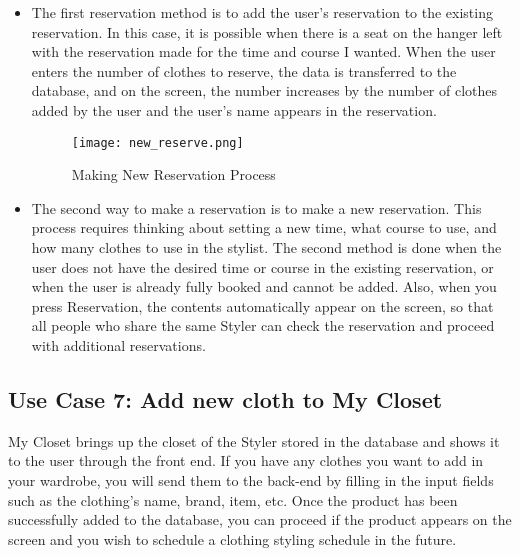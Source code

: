 \documentclass[conference]{IEEEtran}
\begin{document}
\newpage
\begin{itemize}
    \begin{figure}[htbp]
    \centerline{\texttt{[image: add\_reserve.png]}}
    \label{fig}
    \caption{Adding Reservation Process}
    \end{figure}
    \item The first reservation method is to add the user's reservation to the existing reservation. In this case, it is possible when there is a seat on the hanger left with the reservation made for the time and course I wanted. When the user enters the number of clothes to reserve, the data is transferred to the database, and on the screen, the number increases by the number of clothes added by the user and the user's name appears in the reservation.\\
    
    \begin{figure}[htbp]
    \centerline{\texttt{[image: new\_reserve.png]}}
    \label{fig}
    \caption{Making New Reservation Process}
    \end{figure}
    \item The second way to make a reservation is to make a new reservation. This process requires thinking about setting a new time, what course to use, and how many clothes to use in the stylist. The second method is done when the user does not have the desired time or course in the existing reservation, or when the user is already fully booked and cannot be added. Also, when you press Reservation, the contents automatically appear on the screen, so that all people who share the same Styler can check the reservation and proceed with additional reservations.\\
\end{itemize}

\subsection{Use Case 7: Add new cloth to My Closet}
My Closet brings up the closet of the Styler stored in the database and shows it to the user through the front end. If you have any clothes you want to add in your wardrobe, you will send them to the back-end by filling in the input fields such as the clothing's name, brand, item, etc. Once the product has been successfully added to the database, you can proceed if the product appears on the screen and you wish to schedule a clothing styling schedule in the future.\\
\end{document}
